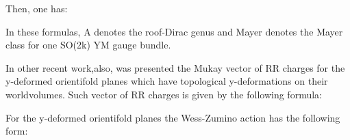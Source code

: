 \documentclass[a4paper,a4paper]{article}
\begin{document}
\begin{center}
 
{  \coordHE{}}
\end{center} 

Then, one has:

\begin{center}
{  \coordHE{} }
\end{center}

\begin{center}
{  \coordHE{} }
\end{center}

In these formulas, A denotes the roof-Dirac genus and Mayer denotes the Mayer class for one SO(2k) YM gauge bundle.

In other recent work,also, was presented the Mukay vector of RR charges for the y-deformed  orientifold planes which have topological y-deformations on their worldvolumes.  Such vector of RR charges is given by the following formula:

\begin{center}
{  \coordHE{} }
\end{center}

For the y-deformed  orientifold planes the Wess-Zumino action has the following form:
\end{document}
